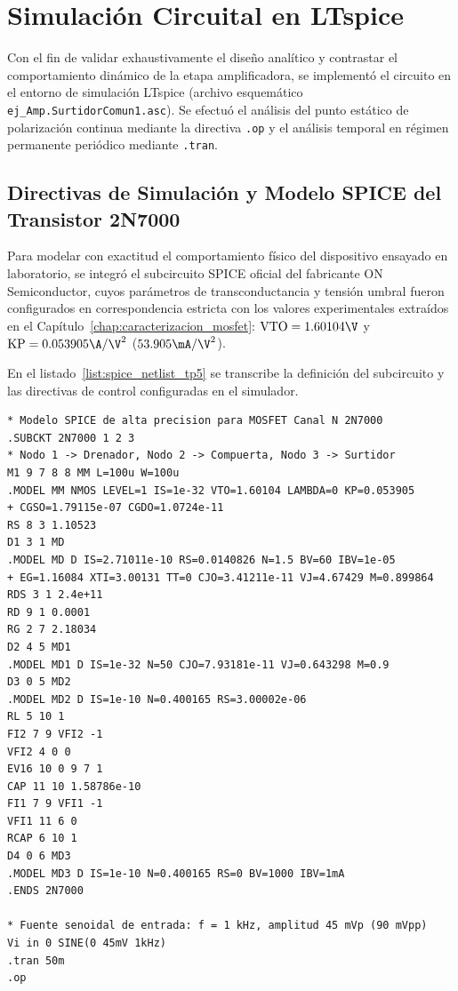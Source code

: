\chapter{Simulación Circuital en LTspice}
\label{chap:simulacion}

Con el fin de validar exhaustivamente el diseño analítico y contrastar el comportamiento dinámico de la etapa amplificadora,
se implementó el circuito en el entorno de simulación LTspice (archivo esquemático \texttt{ej\_Amp.SurtidorComun1.asc}).
Se efectuó el análisis del punto estático de polarización continua mediante la directiva \lstinline[style=ltspice]{.op} y
el análisis temporal en régimen permanente periódico mediante \lstinline[style=ltspice]{.tran}.

\section{Directivas de Simulación y Modelo SPICE del Transistor 2N7000}

Para modelar con exactitud el comportamiento físico del dispositivo ensayado en laboratorio, se integró el subcircuito
SPICE oficial del fabricante ON Semiconductor, cuyos parámetros de transconductancia y tensión umbral fueron configurados
en correspondencia estricta con los valores experimentales extraídos en el Capítulo~\ref{chap:caracterizacion_mosfet}:
$\mathrm{VTO} = 1.60104\V$ y $\mathrm{KP} = 0.053905\A/\V^2$ ($53.905\mA/\V^2$).

En el listado~\ref{list:spice_netlist_tp5} se transcribe la definición del subcircuito y las directivas de control
configuradas en el simulador.

\begin{lstlisting}[style=ltspice, caption={Subcircuito del transistor 2N7000 y directivas de simulación en LTspice.}, label={list:spice_netlist_tp5}]
* Modelo SPICE de alta precision para MOSFET Canal N 2N7000
.SUBCKT 2N7000 1 2 3
* Nodo 1 -> Drenador, Nodo 2 -> Compuerta, Nodo 3 -> Surtidor
M1 9 7 8 8 MM L=100u W=100u
.MODEL MM NMOS LEVEL=1 IS=1e-32 VTO=1.60104 LAMBDA=0 KP=0.053905
+ CGSO=1.79115e-07 CGDO=1.0724e-11
RS 8 3 1.10523
D1 3 1 MD
.MODEL MD D IS=2.71011e-10 RS=0.0140826 N=1.5 BV=60 IBV=1e-05
+ EG=1.16084 XTI=3.00131 TT=0 CJO=3.41211e-11 VJ=4.67429 M=0.899864
RDS 3 1 2.4e+11
RD 9 1 0.0001
RG 2 7 2.18034
D2 4 5 MD1
.MODEL MD1 D IS=1e-32 N=50 CJO=7.93181e-11 VJ=0.643298 M=0.9
D3 0 5 MD2
.MODEL MD2 D IS=1e-10 N=0.400165 RS=3.00002e-06
RL 5 10 1
FI2 7 9 VFI2 -1
VFI2 4 0 0
EV16 10 0 9 7 1
CAP 11 10 1.58786e-10
FI1 7 9 VFI1 -1
VFI1 11 6 0
RCAP 6 10 1
D4 0 6 MD3
.MODEL MD3 D IS=1e-10 N=0.400165 RS=0 BV=1000 IBV=1mA
.ENDS 2N7000

* Fuente senoidal de entrada: f = 1 kHz, amplitud 45 mVp (90 mVpp)
Vi in 0 SINE(0 45mV 1kHz)
.tran 50m
.op
\end{lstlisting}

